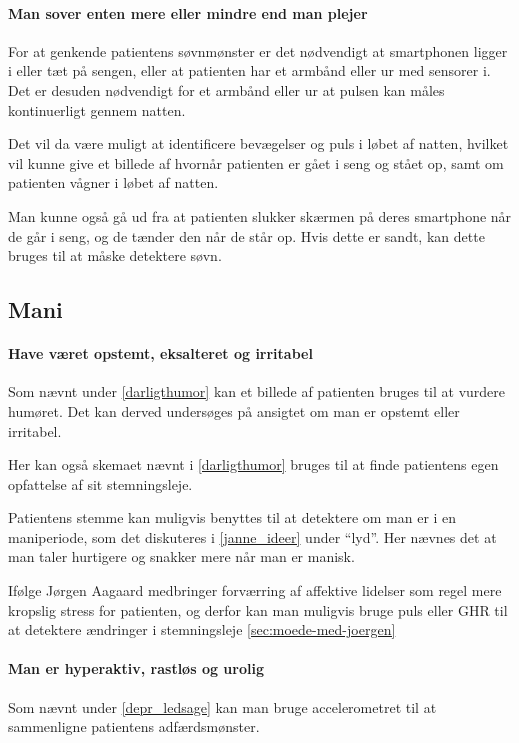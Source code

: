 \paragraph{Man sover enten mere eller mindre end man plejer}
For at genkende patientens søvnmønster er det nødvendigt at smartphonen ligger i eller tæt på sengen, eller at patienten har et armbånd eller ur med sensorer i.
Det er desuden nødvendigt for et armbånd eller ur at pulsen kan måles kontinuerligt gennem natten.

Det vil da være muligt at identificere bevægelser og puls i løbet af natten, hvilket vil kunne give et billede af hvornår patienten er gået i seng og stået op, samt om patienten vågner i løbet af natten.

Man kunne også gå ud fra at patienten slukker skærmen på deres smartphone når de går i seng, og de tænder den når de står op. Hvis dette er sandt, kan dette bruges til at måske detektere søvn.

\subsection{Mani}

\paragraph{Have været opstemt, eksalteret og irritabel}
Som nævnt under \cref{darligthumor} kan et billede af patienten bruges til at vurdere humøret. 
Det kan derved undersøges på ansigtet om man er opstemt eller irritabel.

Her kan også skemaet nævnt i \cref{darligthumor} bruges til at finde patientens egen opfattelse af sit stemningsleje.

Patientens stemme kan muligvis benyttes til at detektere om man er i en maniperiode, som det diskuteres i \cref{janne_ideer} under ``lyd''. 
Her nævnes det at man taler hurtigere og snakker mere når man er manisk.

Ifølge Jørgen Aagaard medbringer forværring af affektive lidelser som regel mere kropslig stress for patienten, og derfor kan man muligvis bruge puls eller GHR til at detektere ændringer i stemningsleje \cref{sec:moede-med-joergen}

\paragraph{Man er hyperaktiv, rastløs og urolig}
Som nævnt under \cref{depr_ledsage} kan man bruge accelerometret til at sammenligne patientens adfærdsmønster.

